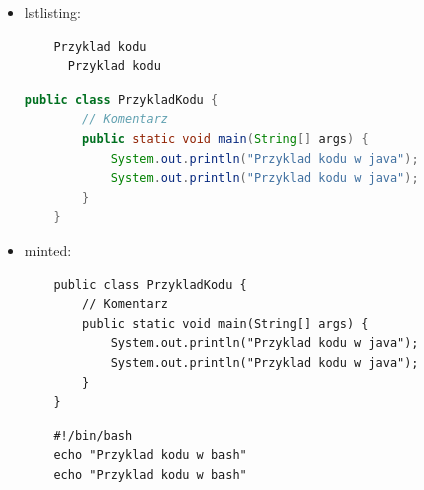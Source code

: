 \documentclass[a4paper,11pt]{article}
\begin{document}
\begin{itemize}
  \item lstlisting: 
  \begin{lstlisting}
    Przyklad kodu
      Przyklad kodu
  \end{lstlisting}

  \begin{lstlisting}[language=java]
    public class PrzykladKodu {
        // Komentarz
        public static void main(String[] args) {
            System.out.println("Przyklad kodu w java");
            System.out.println("Przyklad kodu w java");
        }
    }
  \end{lstlisting}

  \item minted:
  \begin{verbatim}
    public class PrzykladKodu {
        // Komentarz
        public static void main(String[] args) {
            System.out.println("Przyklad kodu w java");
            System.out.println("Przyklad kodu w java");
        }
    }
  \end{verbatim}

  \begin{verbatim}
    #!/bin/bash
    echo "Przyklad kodu w bash"
    echo "Przyklad kodu w bash"
  \end{verbatim}
\end{itemize}
\end{document}
